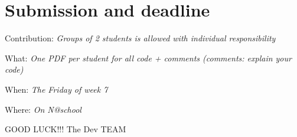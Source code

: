 \documentclass[10pt,a4paper]{article}
\begin{document}
\section{Submission and deadline}

\noindent
Contribution: \textit{Groups of 2 students is allowed with individual responsibility}

\noindent
What: \textit{One PDF per student for all code + comments (comments: explain your code)}

\noindent
When: \textit{The Friday of week 7}

\noindent
Where: \textit{On N@school}


\huge
\centering
GOOD LUCK!!! The Dev TEAM \smiley

	
\end{document}
